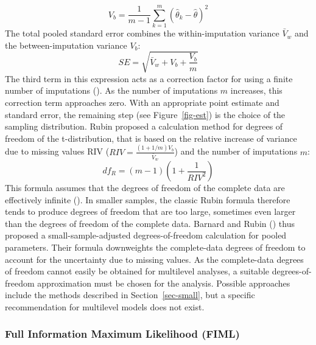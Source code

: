 \documentclass[
  letterpaper,
  11pt,
  english,
  singlespacing,
  headsepline,
  openany]{MastersDoctoralThesis}
\begin{document}
\[
V_b
=
\frac{1}{m-1}
\sum_{k=1}^{m}
(\hat{\theta}_k - \hat{\theta})^2
\] The total pooled standard error combines the within-imputation
variance \(\bar{V}_w\) and the between-imputation variance \(V_b\): \[
SE
=
\sqrt{
\bar{V}_w
+ V_b
+ \frac{V_b}{m}}
\] The third term in this expression acts as a correction factor for
using a finite number of imputations (). As the number of imputations \(m\) increases, this
correction term approaches zero. With an appropriate point estimate and
standard error, the remaining step (see Figure~\ref{fig-est}) is the
choice of the sampling distribution. Rubin proposed a calculation method
for degrees of freedom of the t-distribution, that is based on the
relative increase of variance due to missing values RIV
(\(RIV = \frac{(1 + 1/m)V_b}{\bar{V}_w}\)) and the number of imputations
\(m\): \[
df_R
=
(m-1)
\left(
1+\frac{1}{RIV^2}
\right)
\] This formula assumes that the degrees of freedom of the complete data
are effectively infinite (). In smaller samples, the classic Rubin formula therefore tends to
produce degrees of freedom that are too large, sometimes even larger
than the degrees of freedom of the complete data. Barnard and Rubin
() thus proposed a small-sample-adjusted
degrees-of-freedom calculation for pooled parameters. Their formula
downweights the complete-data degrees of freedom to account for the
uncertainty due to missing values. As the complete-data degrees of
freedom cannot easily be obtained for multilevel analyses, a suitable
degrees-of-freedom approximation must be chosen for the analysis.
Possible approaches include the methods described in
Section~\ref{sec-small}, but a specific recommendation for multilevel
models does not exist.

\subsubsection{Full Information Maximum Likelihood
(FIML)}\label{full-information-maximum-likelihood-fiml}
\end{document}
